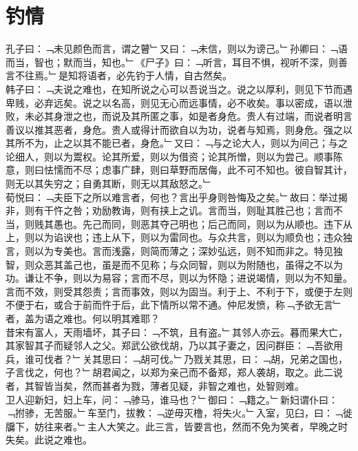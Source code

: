 \chapter{钓情}%
孔子曰：﹁未见颜色而言，谓之瞽﹂又曰：﹁未信，则以为谤己。﹂孙卿曰：﹁语而当，智也；默而当，知也。﹂《尸子》曰：﹁听言，耳目不惧，视听不深，则善言不往焉。﹂是知将语者，必先钓于人情，自古然矣。\\
韩子曰：﹁夫说之难也，在知所说之心可以吾说当之。说之以厚利，则见下节而遇卑贱，必弃远矣。说之以名高，则见无心而远事情，必不收矣。事以密成，语以泄败，未必其身泄之也，而说及其所匿之事，如是者身危。贵人有过端，而说者明言善议以推其恶者，身危。贵人或得计而欲自以为功，说者与知焉，则身危。强之以其所不为，止之以其不能已者，身危。﹂又曰：﹁与之论大人，则以为间己；与之论细人，则以为鬻权。论其所爱，则以为借资；论其所憎，则以为尝己。顺事陈意，则曰怯懦而不尽；虑事广肆，则曰草野而居侮，此不可不知也。彼自智其计，则无以其失穷之；自勇其断，则无以其敌怒之。﹂\\
荀悦曰：﹁夫臣下之所以难言者，何也？言出乎身则咎悔及之矣。﹂故曰：举过揭非，则有干忤之咎；劝励教诲，则有挟上之讥。言而当，则耻其胜己也；言而不当，则贱其愚也。先己而同，则恶其夺己明也；后己而同，则以为从顺也。违下从上，则以为谄谀也；违上从下，则以为雷同也。与众共言，则以为顺负也；违众独言，则以为专美也。言而浅露，则简而薄之；深妙弘远，则不知而非之。特见独智，则众恶其盖己也，虽是而不见称；与众同智，则以为附随也，虽得之不以为功。谦让不争，则以为易容；言而不尽，则以为怀隐；进说竭情，则以为不知量。言而不效，则受其怨责；言而事效，则以为固当。利于上、不利于下，或便于左则不便于右，或合于前而忤于后，此下情所以常不通。仲尼发愤，称﹁予欲无言﹂者，盖为语之难也。何以明其难耶？\\
昔宋有富人，天雨墙坏，其子曰：﹁不筑，且有盗。﹂其邻人亦云。暮而果大亡，其家智其子而疑邻人之父。郑武公欲伐胡，乃以其子妻之，因问群臣：﹁吾欲用兵，谁可伐者？﹂关其思曰：﹁胡可伐。﹂乃戮关其思，曰：﹁胡，兄弟之国也，子言伐之，何也？﹂胡君闻之，以郑为亲己而不备郑，郑人袭胡，取之。此二说者，其智皆当矣，然而甚者为戮，薄者见疑，非智之难也，处智则难。\\
卫人迎新妇，妇上车，问：﹁骖马，谁马也？﹂御曰：﹁籍之。﹂新妇谓仆曰：﹁拊骖，无苦服。﹂车至门，拔教：﹁逆毋灭橹，将失火。﹂入室，见臼，曰：﹁徙牖下，妨往来者。﹂主人大笑之。此三言，皆要言也，然而不免为笑者，早晚之时失矣。此说之难也。\\

